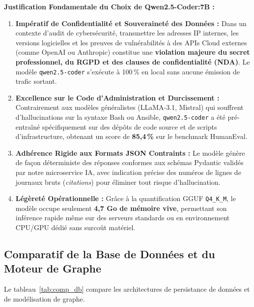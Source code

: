 \par \textbf{Justification Fondamentale du Choix de Qwen2.5-Coder:7B :}
\begin{enumerate}
    \item \textbf{Imp\'eratif de Confidentialit\'e et Souverainet\'e des Donn\'ees :} Dans un contexte d'audit de cybers\'ecurit\'e, transmettre les adresses IP internes, les versions logicielles et les preuves de vuln\'erabilit\'es \`a des APIs Cloud externes (comme OpenAI ou Anthropic) constitue une \textbf{violation majeure du secret professionnel, du RGPD et des clauses de confidentialit\'e (NDA)}. Le mod\`ele \texttt{qwen2.5-coder} s'ex\'ecute \`a 100\,\% en local sans aucune \'emission de trafic sortant.
    \item \textbf{Excellence sur le Code d'Administration et Durcissement :} Contrairement aux mod\`eles g\'en\'eralistes (LLaMA-3.1, Mistral) qui souffrent d'hallucinations sur la syntaxe Bash ou Ansible, \texttt{qwen2.5-coder} a \'et\'e pr\'e-entra\^in\'e sp\'ecifiquement sur des d\'ep\^ots de code source et de scripts d'infrastructure, obtenant un score de \textbf{85,4\,\%} sur le benchmark HumanEval.
    \item \textbf{Adh\'erence Rigide aux Formats JSON Contraints :} Le mod\`ele g\'en\`ere de fa\c{c}on d\'eterministe des r\'eponses conformes aux sch\'emas Pydantic valid\'es par notre microservice IA, avec indication pr\'ecise des num\'eros de lignes de journaux bruts (\textit{citations}) pour \'eliminer tout risque d'hallucination.
    \item \textbf{L\'eg\`eret\'e Op\'erationnelle :} Gr\^ace \`a la quantification GGUF \texttt{Q4\_K\_M}, le mod\`ele occupe seulement \textbf{4,7 Go de m\'emoire vive}, permettant son inf\'erence rapide m\^eme sur des serveurs standards ou en environnement CPU/GPU d\'edi\'e sans surco\^ut mat\'eriel.
\end{enumerate}

\subsection{Comparatif de la Base de Donn\'ees et du Moteur de Graphe}
\par Le tableau~\ref{tab:comp_db} compare les architectures de persistance de donn\'ees et de mod\'elisation de graphe.


